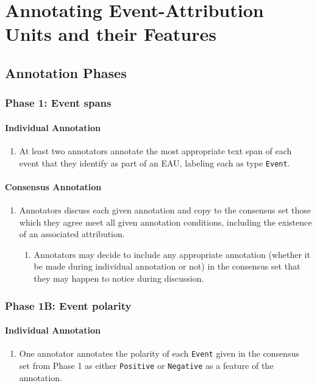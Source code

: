 \documentclass[a4paper,12pt]{article}
\begin{document}
\pagebreak
\section{Annotating Event-Attribution Units and their Features}

    \subsection{Annotation Phases}
    \subsubsection{Phase 1: Event spans}
    \paragraph{Individual Annotation}
        \begin{enumerate}
            \item At least two annotators annotate the most appropriate text span of each event that they identify as part of an EAU, labeling each as type \texttt{Event}.
        \end{enumerate}
    \paragraph{Consensus Annotation}
        \begin{enumerate}
            \item Annotators discuss each given annotation and copy to the consensus set those which they agree meet all given annotation conditions, including the existence of an associated attribution.
                \begin{enumerate}
                    \item Annotators may decide to include any appropriate annotation (whether it be made during individual annotation or not) in the consensus set that they may happen to notice during discussion.
                \end{enumerate}
        \end{enumerate}


    \subsubsection{Phase 1B: Event polarity}
    \paragraph{Individual Annotation}
        \begin{enumerate}
            \item One annotator annotates the polarity of each \texttt{Event} given in the consensus set from Phase 1 as either \texttt{Positive} or \texttt{Negative} as a feature of the annotation.
        \end{enumerate}
\end{document}
